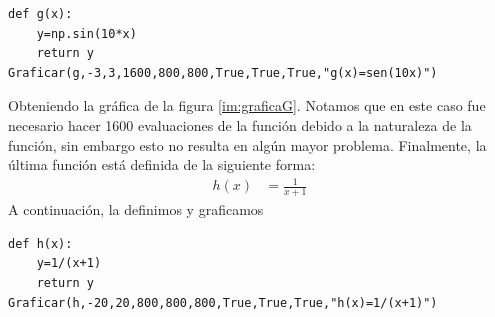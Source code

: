 \documentclass[10pt]{article}
\begin{document}
\begin{verbatim}
def g(x):
    y=np.sin(10*x)
    return y
Graficar(g,-3,3,1600,800,800,True,True,True,"g(x)=sen(10x)")
\end{verbatim}

\noindent Obteniendo la gráfica de la figura \ref{im:graficaG}. Notamos que en este caso fue necesario hacer 1600 evaluaciones de la función debido a la naturaleza de la función, sin embargo esto no resulta en algún mayor problema. Finalmente, la última función está definida de la siguiente forma:
\begin{align}
h(x)&=\frac{1}{x+1}
\end{align}
A continuación, la definimos y graficamos

\begin{verbatim}
def h(x):
    y=1/(x+1)
    return y
Graficar(h,-20,20,800,800,800,True,True,True,"h(x)=1/(x+1)")
\end{verbatim}
\end{document}
